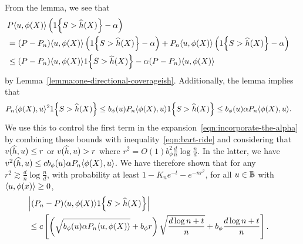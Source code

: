 \documentclass{article}
\newcommand{\radphi}{b_{\phi}}
\newcommand{\scorerv}{S}
\begin{document}
From the lemma, we see that
\begin{align}
  \lefteqn{
    P \<u, \phi(X)\> \left(\indic{\scorerv > \what{h}(X)}
    - \alpha\right)} \nonumber \\
  & = (P - P_n)\<u, \phi(X)\> \left(\indic{\scorerv > \what{h}(X)}
  - \alpha\right)
  + P_n \<u, \phi(X)\> \left(\indic{\scorerv > \what{h}(X)}
  - \alpha\right) \nonumber \\
  & \le (P - P_n) \<u, \phi(X)\> \indic{\scorerv > \what{h}(X)}
  - \alpha (P - P_n) \<u, \phi(X)\>
  \label{eqn:incorporate-the-alpha}
\end{align}
by Lemma~\ref{lemma:one-directional-coverageish}.
%
Additionally, the lemma implies that
\begin{align*}
  P_n\<\phi(X), u\>^2 \indic{\scorerv > \what{h}(X)}
  & \le \radphi(u) P_n \<\phi(X), u\> \indic{\scorerv > \what{h}(X)}
  \le \radphi(u) \alpha P_n \<\phi(X), u\>.
\end{align*}
We use this to control the first term in the
expansion~\eqref{eqn:incorporate-the-alpha}
by combining these bounds with inequality~\eqref{eqn:bart-ride}
and considering
that $v(\widehat{h}, u) \le r$ or $v(\widehat{h}, u) > r$
where $r^2 = O(1) \radphi^2 \frac{d}{n} \log \frac{n}{d}$.
%
In the latter, we have
$v^2(\what{h}, u) \le c \radphi(u) \alpha P_n\<\phi(X), u\>$.
%
We have therefore shown that for
any $r^2 \gtrsim \frac{d}{n} \log \frac{n}{d}$,
with probability at
least $1 - K_n e^{-t} - e^{-n r^2}$,
for all $u \in \mathbb{B}$
with $\langle u, \phi(x)\rangle \ge 0$,
\begin{align}
  \label{eqn:ashby-stop}
  \lefteqn{\left|(P_n - P)\<u, \phi(X)\> \indic{\scorerv > \what{h}(X)}
    \right|}
  \\
  & \le c \left[
    \left(\sqrt{\radphi(u) \alpha P_n \<u, \phi(X)\>} + \radphi r\right)
    \sqrt{\frac{d \log n + t}{n}}
    + \radphi \frac{d \log n + t}{n}
    \right].
  \nonumber
\end{align}
\end{document}

